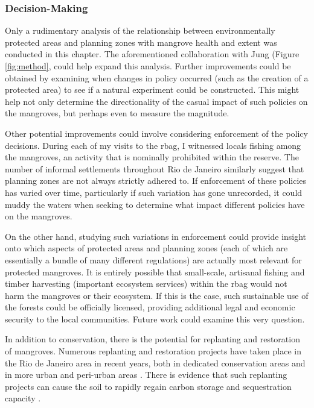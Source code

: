 \subsubsection{Decision-Making}

Only a rudimentary analysis of the relationship between environmentally protected areas and planning zones with mangrove health and extent was conducted in this chapter. The aforementioned collaboration with Jung (Figure \ref{fig:method}, could help expand this analysis. Further improvements could be obtained by examining when changes in policy occurred (such as the creation of a protected area) to see if a natural experiment could be constructed. This might help not only determine the directionality of the casual impact of such policies on the mangroves, but perhaps even to measure the magnitude. 

Other potential improvements could involve considering enforcement of the policy decisions. During each of my visits to the \ac{rbag}, I witnessed locals fishing among the mangroves, an activity that is nominally prohibited within the reserve. The number of informal settlements throughout Rio de Janeiro similarly suggest that planning zones are not always strictly adhered to. If enforcement of these policies has varied over time, particularly if such variation has gone unrecorded, it could muddy the waters when seeking to determine what impact different policies have on the mangroves.

On the other hand, studying such variations in enforcement could provide insight onto which aspects of protected areas and planning zones (each of which are essentially a bundle of many different regulations) are actually most relevant for protected mangroves. It is entirely possible that small-scale, artisanal fishing and timber harvesting (important ecosystem services) within the \ac{rbag} would not harm the mangroves or their ecosystem. If this is the case, such sustainable use of the forests could be officially licensed, providing additional legal and economic security to the local communities. Future work could examine this very question.

In addition to conservation, there is the potential for replanting and restoration of mangroves. Numerous replanting and restoration projects have taken place in the Rio de Janeiro area in recent years, both in dedicated conservation areas \cite{granadoAssessingGeneticDiversity2018} and in more urban and peri-urban areas \cite{rioprefeituraEnvironmentalRecoveryRodrigo2019, soaresEstruturaVegetalGrau1999}. There is evidence that such replanting projects can cause the soil to rapidly regain carbon storage and sequestration capacity \cite{jimenezRecoverySoilProcesses2022}.


